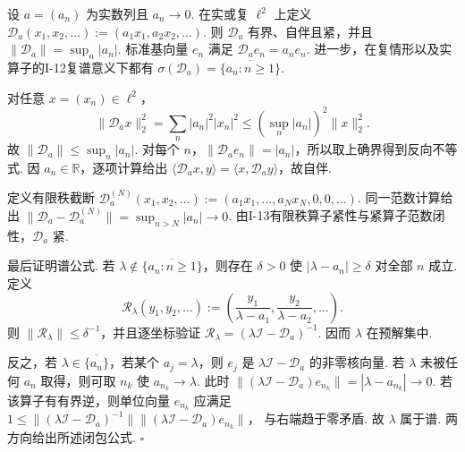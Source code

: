 \begin{FAExample}\label{i14:ex-l2seq}
设 \(\displaystyle a=(a_n)\) 为实数列且 \(\displaystyle a_n\to0\). 在实或复 \(\displaystyle \ell^2\) 上定义
\(\displaystyle \mathcal D_a(x_1,x_2,\dots) := (a_1x_1,a_2x_2,\dots)\).
则 \(\displaystyle \mathcal D_a\) 有界、自伴且紧，并且 \(\displaystyle \|\mathcal D_a\|=\sup_n|a_n|\).
标准基向量 \(\displaystyle e_n\) 满足 \(\displaystyle \mathcal D_ae_n=a_ne_n\). 进一步，在复情形以及实算子的I-12复谱意义下都有 \(\displaystyle \sigma(\mathcal D_a)=\overline{\{a_n:n\geqslant1\}}\).
\end{FAExample}

\begin{FAProof}
对任意 \(\displaystyle x=(x_n)\in\ell^2\)，
\[
\|\mathcal D_ax\|_2^2
=
\sum_n|a_n|^2|x_n|^2
\leqslant
\left(\sup_n|a_n|\right)^2\|x\|_2^2.
\]
故 \(\displaystyle \|\mathcal D_a\|\leqslant\sup_n|a_n|\). 对每个 \(\displaystyle n\)，\(\displaystyle \|\mathcal D_ae_n\|=|a_n|\)，所以取上确界得到反向不等式. 因 \(\displaystyle a_n\in\mathbb R\)，逐项计算给出 \(\displaystyle \langle\mathcal D_ax,y\rangle=\langle x,\mathcal D_ay\rangle\)，故自伴.

定义有限秩截断
\(\displaystyle \mathcal D_a^{(N)}(x_1,x_2,\dots) := (a_1x_1,\dots,a_Nx_N,0,0,\dots)\).
同一范数计算给出 \(\displaystyle \|\mathcal D_a-\mathcal D_a^{(N)}\|=\sup_{n>N}|a_n|\to0\).
由I-13有限秩算子紧性与紧算子范数闭性，\(\displaystyle \mathcal D_a\) 紧.

最后证明谱公式. 若 \(\displaystyle \lambda\notin\overline{\{a_n:n\geqslant1\}}\)，则存在 \(\displaystyle \delta>0\) 使 \(\displaystyle |\lambda-a_n|\geqslant\delta\) 对全部 \(\displaystyle n\) 成立. 定义
\[
\mathcal R_\lambda(y_1,y_2,\dots)
:=
\left(
\frac{y_1}{\lambda-a_1},
\frac{y_2}{\lambda-a_2},
\dots
\right).
\]
则 \(\displaystyle \|\mathcal R_\lambda\|\leqslant\delta^{-1}\)，并且逐坐标验证 \(\displaystyle \mathcal R_\lambda=(\lambda\mathcal I-\mathcal D_a)^{-1}\). 因而 \(\displaystyle \lambda\) 在预解集中.

反之，若 \(\displaystyle \lambda\in\overline{\{a_n\}}\)，若某个 \(\displaystyle a_j=\lambda\)，则 \(\displaystyle e_j\) 是 \(\displaystyle \lambda\mathcal I-\mathcal D_a\) 的非零核向量. 若 \(\displaystyle \lambda\) 未被任何 \(\displaystyle a_n\) 取得，则可取 \(\displaystyle n_k\) 使 \(\displaystyle a_{n_k}\to\lambda\). 此时 \(\displaystyle \|(\lambda\mathcal I-\mathcal D_a)e_{n_k}\|=|\lambda-a_{n_k}|\to0\).
若该算子有有界逆，则单位向量 \(\displaystyle e_{n_k}\) 应满足
\(\displaystyle 1 \leqslant \|(\lambda\mathcal I-\mathcal D_a)^{-1}\| \|(\lambda\mathcal I-\mathcal D_a)e_{n_k}\|\)，
与右端趋于零矛盾. 故 \(\displaystyle \lambda\) 属于谱. 两方向给出所述闭包公式.
\hfill\(\square\)
\end{FAProof}

